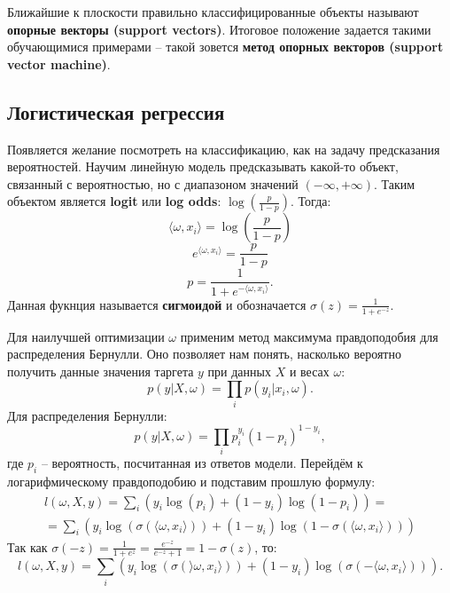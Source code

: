 \documentclass[a4paper, 10pt, openany]{book} %
\begin{document}
	Ближайшие к плоскости правильно классифицированные объекты называют \textbf{опорные векторы (support vectors)}. Итоговое положение задается такими обучающимися примерами -- такой зовется \textbf{метод опорных векторов (support vector machine)}.
	
	\subsection{Логистическая регрессия}
	
	Появляется желание посмотреть на классификацию, как на задачу предсказания вероятностей. Научим линейную модель предсказывать какой-то объект, связанный с вероятностью, но с диапазоном значений $(-\infty, +\infty)$. Таким объектом является \textbf{logit} или \textbf{log odds}: $\log\left(\frac{p}{1-p}\right)$. Тогда:
	\begin{equation*}
	    \langle\omega,x_i\rangle = \log\left(\frac{p}{1 - p}\right)
	\end{equation*}
	\begin{equation*}
	    e^{\langle\omega,x_i\rangle}  = \frac{p}{1 - p}
	\end{equation*}
	\begin{equation*}
	    p = \frac{1}{1 + e^{-\langle\omega,x_i\rangle}}.
	\end{equation*}
	Данная фукнция называется \textbf{сигмоидой} и обозначается $\sigma(z) = \frac{1}{1 + e^{-z}}$.
	
	Для наилучшей оптимизации $\omega$ применим метод максимума правдоподобия для распределения Бернулли. Оно позволяет нам понять, насколько вероятно получить данные значения таргета $y$ при данных $X$ и весах $\omega$:
	\begin{equation*}
	    p\left(y | X,\omega\right) = \prod_i p(y_i | x_i, \omega).
	\end{equation*}
	Для распределения Бернулли:
	\begin{equation*}
	    p\left(y | X,\omega\right) = \prod_i p_i^{y_i} (1 - p_i)^{1 - y_i},
	\end{equation*}
	где $p_i$ -- вероятность, посчитанная из ответов модели. Перейдём к логарифмическому правдоподобию и подставим прошлую формулу:
	\begin{multline*}
	    l\left(\omega, X, y\right) = \sum_{i}(y_i \log(p_i) + (1 - y_i) \log(1 - p_i)) = \\
        = \sum_{i}(y_i \log(\sigma(\langle \omega, x_i \rangle)) + (1 - y_i) \log(1 - \sigma(\langle\omega,x_i\rangle))) 
	\end{multline*}
	Так как $\sigma(-z) = \frac{1}{1 + e^z} = \frac{e^{-z}}{e^{-z} + 1} = 1 - \sigma(z)$, то:
	\begin{equation*}
	    l(\omega, X, y) = \sum_{i}(y_i \log(\sigma(\rangle\omega,x_i\rangle)) + (1 - y_i)\log(\sigma(-\langle\omega,x_i\rangle))).
	\end{equation*}
	
\end{document}

